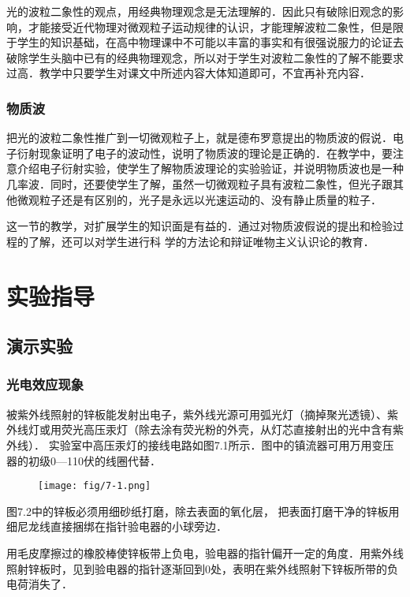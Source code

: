 光的波粒二象性的观点，用经典物理观念是无法理解的．因此只有破除旧观念的影响，才能接受近代物理对微观粒子运动规律的认识，才能理解波粒二象性，但是限于学生的知识基础，在高中物理课中不可能以丰富的事实和有很强说服力的论证去破除学生头脑中已有的经典物理观念，所以对于学生对波粒二象性的了解不能要求过高．教学中只要学生对课文中所述内容大体知道即可，不宜再补充内容．

\subsubsection{物质波}

把光的波粒二象性推广到一切微观粒子上，就是德布罗意提出的物质波的假说．电子衍射现象证明了电子的波动性，说明了物质波的理论是正确的．在教学中，要注意介绍电子衍射实验，使学生了解物质波理论的实验验证，并说明物质波也是一种几率波．同时，还要使学生了解，虽然一切微观粒子具有波粒二象性，但光子跟其他微观粒子还是有区别的，光子是永远以光速运动的、没有静止质量的粒子．

这一节的教学，对扩展学生的知识面是有益的．通过对物质波假说的提出和检验过程的了解，还可以对学生进行科
学的方法论和辩证唯物主义认识论的教育．

\section{实验指导}
\subsection{演示实验}
\subsubsection{光电效应现象}

被紫外线照射的锌板能发射出电子，紫外线光源可用弧光灯（摘掉聚光透镜）、紫外线灯或用荧光高压汞灯（除去涂有荧光粉的外壳，从灯芯直接射出的光中含有紫外线）． 实验室中高压汞灯的接线电路如图7.1所示．图中的镇流器可用万用变压器的初级0—110伏的线圈代替．
\begin{figure}[htp]
    \centering
\texttt{[image: fig/7-1.png]}
    \caption{}
\end{figure}

图7.2中的锌板必须用细砂纸打磨，除去表面的氧化层，
把表面打磨干净的锌板用细尼龙线直接捆绑在指针验电器的小球旁边．

用毛皮摩擦过的橡胶棒使锌板带上负电，验电器的指针偏开一定的角度．用紫外线照射锌板时，见到验电器的指针逐渐回到0处，表明在紫外线照射下锌板所带的负电荷消失了．

